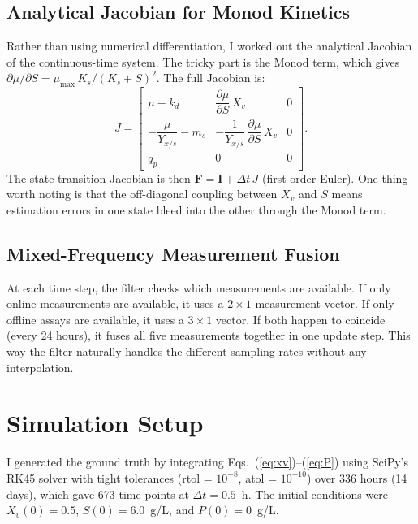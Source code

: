 \documentclass[11pt,letterpaper]{article}
\newcommand{\xv}{X_{v}}
\newcommand{\mumax}{\mu_{\max}}
\newcommand{\Ks}{K_{s}}
\newcommand{\kd}{k_{d}}
\newcommand{\Yxs}{Y_{x/s}}
\newcommand{\ms}{m_{s}}
\newcommand{\qp}{q_{p}}
\newcommand{\bF}{\mathbf{F}}
\newcommand{\bI}{\mathbf{I}}
\begin{document}
\subsection{Analytical Jacobian for Monod Kinetics}

Rather than using numerical differentiation, I worked out the analytical Jacobian of the
continuous-time system. The tricky part is the Monod term, which gives
$\partial\mu/\partial S = \mumax\,\Ks / (\Ks + S)^2$.
The full Jacobian is:
\begin{equation}
    J =
    \begin{bmatrix}
        \mu - \kd
            & \dfrac{\partial\mu}{\partial S}\,\xv
            & 0 \\[8pt]
        -\dfrac{\mu}{\Yxs} - \ms
            & -\dfrac{1}{\Yxs}\,\dfrac{\partial\mu}{\partial S}\,\xv
            & 0 \\[8pt]
        \qp & 0 & 0
    \end{bmatrix}.
    \label{eq:jacobian}
\end{equation}
The state-transition Jacobian is then $\bF = \bI + \Delta t\,J$ (first-order Euler). One thing
worth noting is that the off-diagonal coupling between $\xv$ and $S$ means estimation errors
in one state bleed into the other through the Monod term.

\subsection{Mixed-Frequency Measurement Fusion}

At each time step, the filter checks which measurements are available. If only online
measurements are available, it uses a $2\times 1$ measurement vector. If only offline assays
are available, it uses a $3\times 1$ vector. If both happen to coincide (every 24 hours), it
fuses all five measurements together in one update step. This way the filter naturally handles
the different sampling rates without any interpolation.

\section{Simulation Setup}
\label{sec:sim}

I generated the ground truth by integrating Eqs.~(\ref{eq:xv})--(\ref{eq:P}) using SciPy's
RK45 solver with tight tolerances (rtol = $10^{-8}$, atol = $10^{-10}$) over 336 hours
(14 days), which gave 673 time points at $\Delta t = 0.5$~h. The initial conditions were
$\xv(0) = 0.5$, $S(0) = 6.0$~g/L, and $P(0) = 0$~g/L.
\end{document}
